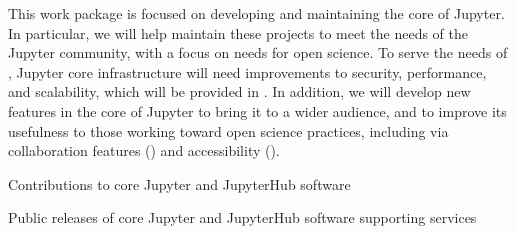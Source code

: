 \begin{workpackage}
\begin{wpdescription}
This work package is focused on developing and maintaining
the core of Jupyter.
In particular, we will help maintain these projects to meet the needs of the
Jupyter community, with a focus on needs for open science.
To serve the needs of \TheProject,
Jupyter core infrastructure will need improvements
to security, performance, and scalability,
which will be provided in .
In addition, we will develop new features in the core of Jupyter
to bring it to a wider audience,
and to improve its usefulness to those working toward open science practices,
including via collaboration features ()
and accessibility ().


\end{wpdescription}

\begin{tasklist}






\end{tasklist}


\begin{wpdelivs}

  \begin{wpdeliv}[due=24,miles=prototype,id=jupyter-contributions,dissem=PU,nature=OTHER,lead=SRL]
    {Contributions to core Jupyter and JupyterHub software}
  \end{wpdeliv}

  \begin{wpdeliv}[due=36,miles=final,id=jupyter-releases,dissem=PU,nature=OTHER,lead=SRL]
    {Public releases of core Jupyter and JupyterHub software supporting \TheProject services}
  \end{wpdeliv}


\end{wpdelivs}

\end{workpackage}

